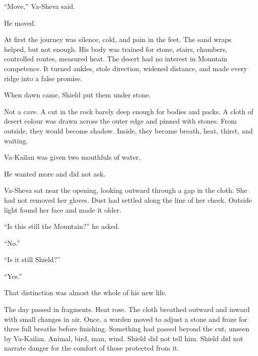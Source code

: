 “Move,” Va-Sheva said.\par

He moved.\par

At first the journey was silence, cold, and pain in the feet. The sand wraps helped, but not enough. His body was trained for stone, stairs, chambers, controlled routes, measured heat. The desert had no interest in Mountain competence. It turned ankles, stole direction, widened distance, and made every ridge into a false promise.\par

When dawn came, Shield put them under stone.\par

Not a cave. A cut in the rock barely deep enough for bodies and packs. A cloth of desert colour was drawn across the outer edge and pinned with stones. From outside, they would become shadow. Inside, they became breath, heat, thirst, and waiting.\par

Va-Kailan was given two mouthfuls of water.\par

He wanted more and did not ask.\par

Va-Sheva sat near the opening, looking outward through a gap in the cloth. She had not removed her gloves. Dust had settled along the line of her cheek. Outside light found her face and made it older.\par

“Is this still the Mountain?” he asked.\par

“No.”\par

“Is it still Shield?”\par

“Yes.”\par

That distinction was almost the whole of his new life.\par

The day passed in fragments. Heat rose. The cloth breathed outward and inward with small changes in air. Once, a warden moved to adjust a stone and froze for three full breaths before finishing. Something had passed beyond the cut, unseen by Va-Kailan. Animal, bird, man, wind. Shield did not tell him. Shield did not narrate danger for the comfort of those protected from it.\par

